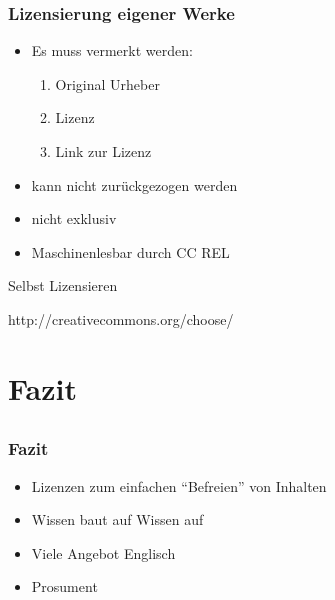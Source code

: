 \documentclass[table]{beamer}
\begin{document}
\begin{frame}
    \frametitle{Lizensierung eigener Werke}
    \begin{itemize}
        \item<2-> Es muss vermerkt werden:
            \begin{enumerate}
                \item<3-> Original Urheber
                \item<4-> Lizenz
                \item<5-> Link zur Lizenz
            \end{enumerate}
        \item<6-> kann nicht zurückgezogen werden
        \item<7-> nicht exklusiv
        \item<8-> Maschinenlesbar durch CC REL
    \end{itemize}
\end{frame}

\begin{frame}
    \begin{center}\Large
    Selbst Lizensieren
    \end {center}
\end{frame}

\begin{frame}
    \begin{center}\Large
    http://creativecommons.org/choose/
    \end {center}
\end{frame}

\section{Fazit}
\subsection{}

\begin{frame}
    \frametitle{Fazit}
    \begin{itemize}
      \item<2-> Lizenzen zum einfachen ``Befreien'' von Inhalten
      \item<3-> Wissen baut auf Wissen auf
      \item<4-> Viele Angebot Englisch
      \item<5-> Prosument
    \end{itemize}
\end{frame}
\end{document}
